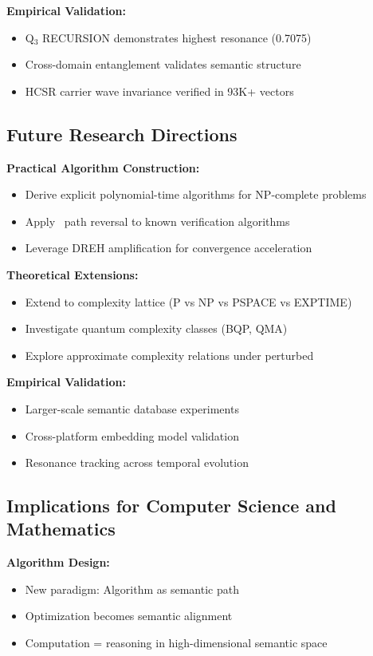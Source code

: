 \textbf{Empirical Validation:}
\begin{itemize}
    \item Q$_3$ RECURSION demonstrates highest resonance (0.7075)
    \item Cross-domain entanglement validates semantic structure
    \item HCSR carrier wave invariance verified in 93K+ vectors
\end{itemize}

\subsection{Future Research Directions}

\textbf{Practical Algorithm Construction:}
\begin{itemize}
    \item Derive explicit polynomial-time algorithms for NP-complete problems
    \item Apply \TSP\ path reversal to known verification algorithms
    \item Leverage DREH amplification for convergence acceleration
\end{itemize}

\textbf{Theoretical Extensions:}
\begin{itemize}
    \item Extend to complexity lattice (P vs NP vs PSPACE vs EXPTIME)
    \item Investigate quantum complexity classes (BQP, QMA)
    \item Explore approximate complexity relations under perturbed \TSP
\end{itemize}

\textbf{Empirical Validation:}
\begin{itemize}
    \item Larger-scale semantic database experiments
    \item Cross-platform embedding model validation
    \item Resonance tracking across temporal evolution
\end{itemize}

\subsection{Implications for Computer Science and Mathematics}

\textbf{Algorithm Design:}
\begin{itemize}
    \item New paradigm: Algorithm as semantic path
    \item Optimization becomes semantic alignment
    \item Computation = reasoning in high-dimensional semantic space
\end{itemize}


